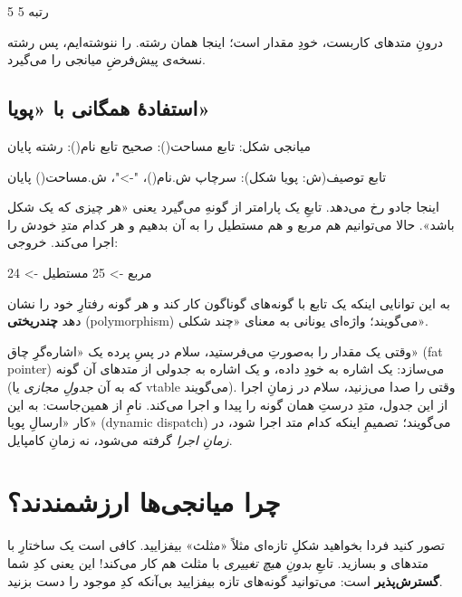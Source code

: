 \begin{progoutfa}
5
رتبه 5
\end{progoutfa}

درونِ متدهای کاربست،  خودِ مقدار است؛ اینجا همان رشته. 
را ننوشته‌ایم، پس رشته نسخه‌ی پیش‌فرضِ میانجی را می‌گیرد.

\subsection{استفادهٔ همگانی با «پویا»}

\begin{salamfa}
میانجی شکل:
    تابع مساحت(): صحیح
    تابع نام(): رشته
پایان

تابع توصیف(ش: پویا شکل):
    سرچاپ ش.نام()، "->"، ش.مساحت()
پایان
\end{salamfa}

اینجا جادو رخ می‌دهد. تابعِ  یک پارامتر از گونهِ 
می‌گیرد یعنی «هر چیزی که یک شکل باشد». حالا می‌توانیم هم مربع و هم مستطیل را
به آن بدهیم و هر کدام متدِ خودش را اجرا می‌کند. خروجی:

\begin{progoutfa}
مربع -> 25
مستطیل -> 24
\end{progoutfa}

به این توانایی اینکه یک تابع با گونه‌های گوناگون کار کند و هر گونه رفتارِ خود
را نشان دهد \textbf{چندریختی} (polymorphism) می‌گویند؛ واژه‌ای یونانی به
معنای «چند شکلی».

\begin{deep}
وقتی یک مقدار را به‌صورتِ  می‌فرستید، سلام در پسِ پرده یک
«اشاره‌گرِ چاق» (fat pointer) می‌سازد: یک اشاره به خودِ داده، و یک اشاره به
جدولی از متدهای آن گونه (که به آن \emph{جدولِ مجازی} یا vtable می‌گویند). وقتی
 را صدا می‌زنید، سلام در زمانِ اجرا از این جدول، متدِ درستِ
همان گونه را پیدا و اجرا می‌کند. نامِ  از همین‌جاست: به این کار
«ارسالِ پویا» (dynamic dispatch) می‌گویند؛ تصمیمِ اینکه کدام متد اجرا شود،
در \emph{زمانِ اجرا} گرفته می‌شود، نه زمانِ کامپایل.
\end{deep}

\section{چرا میانجی‌ها ارزشمندند؟}

تصور کنید فردا بخواهید شکلِ تازه‌ای مثلاً «مثلث» بیفزایید. کافی است یک
ساختارِ  با متدهای  و  بسازید. تابعِ
 \emph{بدونِ هیچ تغییری} با مثلث هم کار می‌کند! این یعنی کدِ شما
\textbf{گسترش‌پذیر} است: می‌توانید گونه‌های تازه بیفزایید بی‌آنکه کدِ موجود را
دست بزنید.

